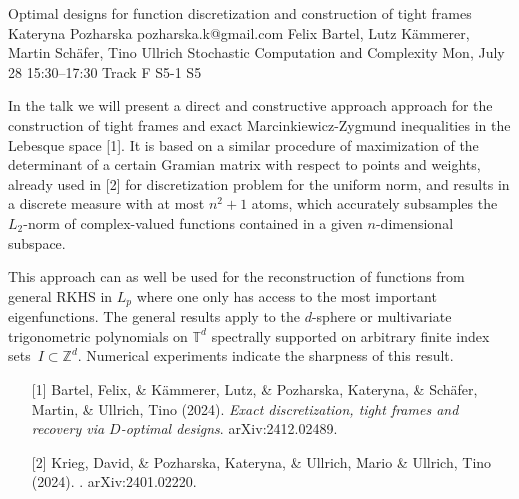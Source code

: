 \begin{talk}
  {Optimal designs for function discretization and construction of tight frames}%
  {Kateryna Pozharska}%
  {pozharska.k@gmail.com}%
  {Felix Bartel,  Lutz K\"ammerer,  Martin Sch\"afer, Tino Ullrich}%
  {Stochastic Computation and Complexity}%
  {}%
  {Mon, July 28 15:30–17:30 Track F}%
  {S5-1}%
  {S5}%
				



\medskip

In the talk we will present a direct and constructive approach approach for the construction of tight frames and exact Marcinkiewicz-Zygmund inequalities in the Lebesque space [1]. 
It is based on a similar procedure of maximization of the determinant of a certain Gramian matrix with respect to points and weights, already used in [2] for discretization problem for the uniform norm, and results in a discrete measure  with at most $n^2+1$ atoms, which accurately subsamples the $L_2$-norm of complex-valued functions contained in a  given $n$-dimensional subspace.

This approach can as well be used for the reconstruction of functions from general RKHS in $L_p$ where one only has access to the most important eigenfunctions. The general results apply to the $d$-sphere or multivariate trigonometric polynomials on $\mathbb{T}^d$ spectrally supported on arbitrary finite index sets~$I \subset \mathbb{Z}^d$.  Numerical experiments indicate the sharpness of this result.


\begin{enumerate}
	\item[{[1]}]  Bartel, Felix,  \& Kämmerer, Lutz,  \& Pozharska,  Kateryna, \& Schäfer, Martin,  \& \newline Ullrich, Tino (2024). {\it Exact discretization, tight frames and recovery via $D$-optimal designs}. arXiv:2412.02489.
    
	\item[{[2]}] Krieg, David, \&  Pozharska, Kateryna, \& Ullrich, Mario \&  Ullrich, Tino (2024). . arXiv:2401.02220.

\end{enumerate}


\end{talk}


